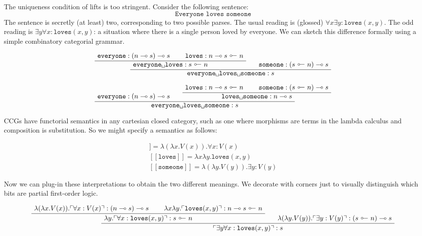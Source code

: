 \begin{example}
The uniqueness condition of lifts is too stringent. Consider the following sentence:
\[\texttt{Everyone loves someone}\]
The sentence is secretly (at least) two, corresponding to two possible parses. The usual reading is (glossed) $\forall x \exists y : \texttt{loves}(x,y)$. The odd reading is $\exists y \forall x : \texttt{loves}(x,y)$: a situation where there is a single person loved by everyone. We can sketch this difference formally using a simple combinatory categorial grammar.

\[
\AxiomC{$\texttt{everyone} : (n \multimap s) \multimap s$}
\AxiomC{$\texttt{loves} : n \multimap s \ \rotatebox[origin=c]{180}{$\multimap$} \ n$}
\BinaryInfC{$\texttt{everyone\textvisiblespace loves} : s \ \rotatebox[origin=c]{180}{$\multimap$} \ n$}
\AxiomC{$\texttt{someone} : (s \ \rotatebox[origin=c]{180}{$\multimap$} \ n) \multimap s$}
\BinaryInfC{$\texttt{everyone\textvisiblespace loves\textvisiblespace someone} : s$}
\DisplayProof
\]

\[
\AxiomC{$\texttt{everyone} : (n \multimap s) \multimap s$}
\AxiomC{$\texttt{loves} : n \multimap s \ \rotatebox[origin=c]{180}{$\multimap$} \ n$}
\AxiomC{$\texttt{someone} : (s \ \rotatebox[origin=c]{180}{$\multimap$} \ n) \multimap s$}
\BinaryInfC{$\texttt{loves\textvisiblespace someone} : n \multimap s$}
\BinaryInfC{$\texttt{everyone\textvisiblespace loves\textvisiblespace someone} : s$}
\DisplayProof
\]

CCGs have functorial semantics in any cartesian closed category, such as one where morphisms are terms in the lambda calculus and composition is substitution. So we might specify a semantics as follows:

\begin{align}
[\![ \texttt{everyone} ]\!] = \lambda (\lambda x . V(x)) . \forall x : V(x) \\
[\![ \texttt{loves} ]\!] = \lambda x \lambda y . \texttt{loves}(x,y) \\
[\![ \texttt{someone} ]\!] = \lambda (\lambda y . V(y)) . \exists y : V(y)
\end{align}

Now we can plug-in these interpretations to obtain the two different meanings. We decorate with corners just to visually distinguish which bits are partial first-order logic.

\newpage

\[
\AxiomC{$\lambda (\lambda x . V(x)) . \ulcorner \forall x : V(x) \urcorner : (n \multimap s) \multimap s$}
\AxiomC{$\lambda x \lambda y . \ulcorner \texttt{loves}(x,y) \urcorner : n \multimap s \ \rotatebox[origin=c]{180}{$\multimap$} \ n$}
\BinaryInfC{$ \lambda y . \ulcorner \forall x : \texttt{loves}(x,y) \urcorner : s \ \rotatebox[origin=c]{180}{$\multimap$} \ n$}
\AxiomC{$\lambda (\lambda y . V(y)) . \ulcorner \exists y : V(y) \urcorner : (s \ \rotatebox[origin=c]{180}{$\multimap$} \ n) \multimap s$}
\BinaryInfC{$ \ulcorner \exists y \forall x : \texttt{loves}(x,y) \urcorner : s$}
\DisplayProof
\]


\end{example}
